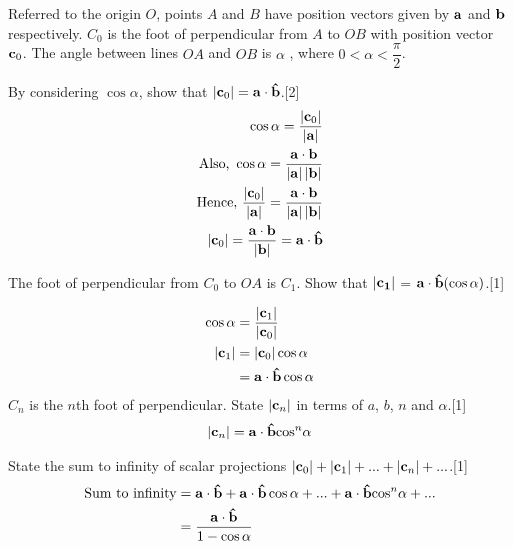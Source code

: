\documentclass[12pt, a4 paper]{article}
\begin{document}
\begin{outline}[enumerate]
	\1 Referred to the origin $O$, points $A$ and $B$ have position vectors given by ${\bf{a}}$ and ${\bf{b}}$ respectively. ${C_0}$ is the foot of perpendicular from $A$ to $OB$ with position vector ${{\bf{c}}_0}$. The angle between lines $OA$ and $OB$ is $\alpha$ , where $ 0< \alpha  < \dfrac{\pi}{2}$.

	\2 By considering $\cos{\alpha}$, show that $|{\bf{c}}_0|= {\bf{a}} \cdot {\bf{\hat b}}$.\hfill[2]
	\color{blue}
	\begin{align*}
		\cos \alpha  = \dfrac{{\left| {{{\bf{c}}_0}} \right|}}{{\left| {\bf{a}} \right|}}
		                                                                                  \\{\textrm{Also, }}\cos \alpha  = \dfrac{{{\bf{a}} \cdot {\bf{b}}}}{{\left| {\bf{a}} \right|\left| {\bf{b}} \right|}}
		                                                                                  \\{\textrm{Hence, }}\dfrac{{\left| {{{\bf{c}}_0}} \right|}}{{\left| {\bf{a}} \right|}} = \dfrac{{{\bf{a}} \cdot {\bf{b}}}}{{\left| {\bf{a}} \right|\left| {\bf{b}} \right|}}\\\left| {{{\bf{c}}_0}} \right| = \dfrac{{{\bf{a}} \cdot {\bf{b}}}}{{\left| {\bf{b}} \right|}} = {\bf{a}} \cdot {\bf{\hat b}}
	\end{align*}

	\color{black}
	\2 The foot of perpendicular from ${C_0}$ to $OA$ is ${C_1}$. Show that $|\bf{c}_1|$ = ${\bf{a}} \cdot {\bf{\hat b}}(\cos \alpha )$.\hfill[1]

	\color{blue}
	\begin{align*}
		\cos \alpha & = \dfrac{{\left| {{{\bf{c}}_1}} \right|}}{{\left| {{{\bf{c}}_0}} \right|}} \\\left| {{{\bf{c}}_1}} \right| &= \left| {{{\bf{c}}_0}} \right|\cos \alpha  \\&= {\bf{a}} \cdot {\bf{\hat b}}\cos \alpha
	\end{align*}
	\color{black}
	\2 ${C_n}$ is the $n$th foot of perpendicular. State $\left| {{{\bf{c}}_n}} \right|$ in terms of $a$, $b$, $n$ and $\alpha$.\hfill[1]
	\color{blue}
	\begin{align*}
		\left| {{{\bf{c}}_n}} \right| = {\bf{a}} \cdot {\bf{\hat b}}{\cos ^n}\alpha
	\end{align*}
	\color{black}

	\2 State the sum to infinity of scalar projections $\left| {{{\bf{c}}_0}} \right| + \left| {{{\bf{c}}_1}} \right| + ... + \left| {{{\bf{c}}_n}} \right| + ...$.\hfill[1]
	\color{blue}
	\begin{align*}
		{\textrm{Sum to infinity}} & = {\bf{a}} \cdot {\bf{\hat b}} + {\bf{a}} \cdot {\bf{\hat b}}\cos \alpha  + ... + {\bf{a}} \cdot {\bf{\hat b}}{\cos ^n}\alpha  + ... \\ &= \dfrac{{{\bf{a}} \cdot {\bf{\hat b}}}}{{1 - \cos \alpha }}
	\end{align*}


\end{outline}
\end{document}
